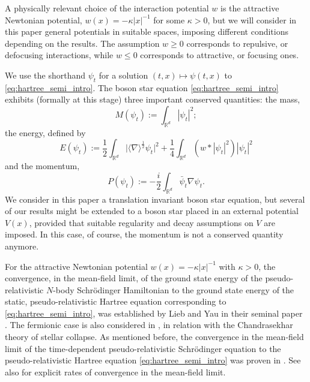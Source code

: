 \documentclass[12pt]{article}
\theoremstyle{plain}
\begin{document}
A physically relevant choice of the interaction potential $w$ is the attractive Newtonian potential, $w(x)=-\kappa|x|^{-1}$ for some $\kappa>0$, but we will consider in this paper general potentials in suitable spaces, imposing different conditions depending on the results. The assumption $w\ge0$ corresponds to repulsive, or defocusing interactions, while $w\le0$ corresponds to attractive, or focusing ones.

We use the shorthand $\psi_t$ for a solution $(t,x)\mapsto\psi(t,x)$ to \eqref{eq:hartree_semi_intro}. The boson star equation \eqref{eq:hartree_semi_intro} exhibits (formally at this stage) three important conserved quantities: the mass,  
\begin{equation}\label{eq:def_mass_intro}
    M(\psi_t):=\int_{\mathbb{R}^d}|\psi_t|^2;
\end{equation}
the energy, defined by
\begin{equation}\label{eq:def_energy_intro}
    E(\psi_t):=\frac12\int_{\mathbb{R}^d}\big|\langle\nabla\rangle^{\frac12}\psi_t\big|^2+\frac14\int_{\mathbb{R}^d}(w*|\psi_t|^2)|\psi_t|^2
\end{equation}
and the momentum,
\begin{equation}\label{eq:def_momentum_intro}
    P(\psi_t):=-\frac{i}{2}\int_{\mathbb{R}^d}\bar\psi_t\nabla\psi_t.
\end{equation}
We consider in this paper a translation invariant boson star equation, but several of our results might be extended to a boson star placed in an external potential $V(x)$, provided that suitable regularity and decay assumptions on $V$ are imposed. In this case, of course, the momentum is not a conserved quantity anymore.

For the attractive Newtonian potential $w(x)=-\kappa|x|^{-1}$ with $\kappa>0$, the convergence, in the mean-field limit, of the ground state energy of the pseudo-relativistic $N$-body Schrödinger Hamiltonian to the ground state energy of the static, pseudo-relativistic Hartree equation corresponding to \eqref{eq:hartree_semi_intro}, was established by Lieb and Yau in their seminal paper \cite{LiebYau1}. The fermionic case is also considered in \cite{LiebYau1}, in relation with the Chandrasekhar theory of stellar collapse. As mentioned before, the convergence in the mean-field limit of the time-dependent pseudo-relativistic Schrödinger equation to the pseudo-relativistic Hartree equation \eqref{eq:hartree_semi_intro}  was proven in \cite{ElgartSchlein}. See also \cites{Knowles-Pizzo,Lee} for explicit rates of convergence in the mean-field limit.
\end{document}
